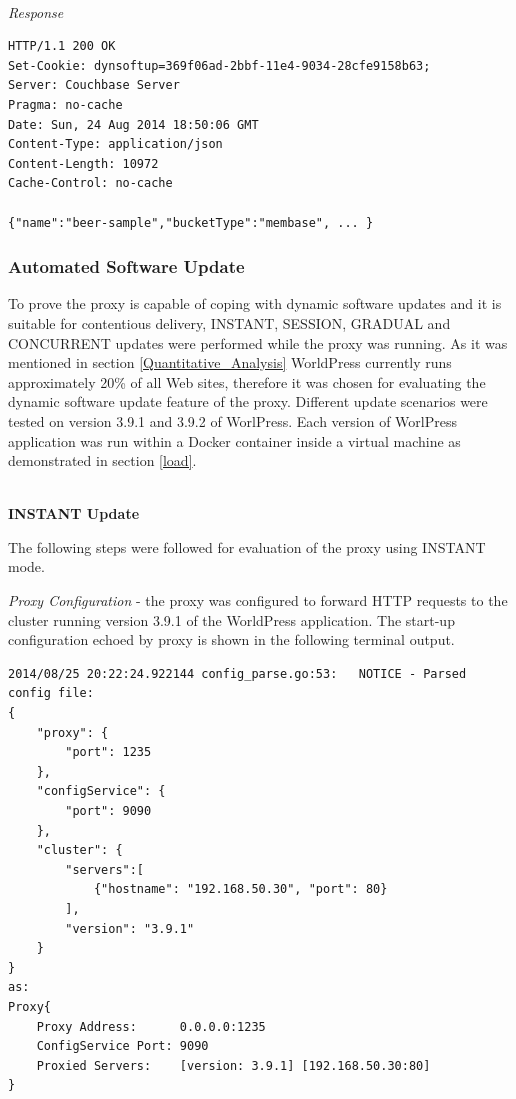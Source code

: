 \documentclass[a4paper,11pt,twoside]{article}
\begin{document}
\noindent\\
\textit{Response}
\begin{lstlisting}[language=terminal]
HTTP/1.1 200 OK
Set-Cookie: dynsoftup=369f06ad-2bbf-11e4-9034-28cfe9158b63;
Server: Couchbase Server
Pragma: no-cache
Date: Sun, 24 Aug 2014 18:50:06 GMT
Content-Type: application/json
Content-Length: 10972
Cache-Control: no-cache

{"name":"beer-sample","bucketType":"membase", ... }
\end{lstlisting}

\subsubsection{Automated Software Update} 
To prove the proxy is capable of coping with dynamic software updates and it is suitable for contentious delivery, INSTANT, SESSION, GRADUAL and CONCURRENT updates were performed while the proxy was running.  As it was mentioned in section \ref{Quantitative_Analysis} WorldPress currently runs approximately 20\% of all Web sites, therefore it was chosen for evaluating the dynamic software update feature of the proxy. Different update scenarios were tested on version 3.9.1 and 3.9.2 of WorlPress. Each version of WorlPress application was run within a Docker container inside a virtual machine as demonstrated in section \ref{load}. 

\noindent\\
\textbf{INSTANT Update}

\noindent
The following steps were followed for evaluation of the proxy using INSTANT mode.\medskip

\noindent
\textit{Proxy Configuration} - the proxy was configured to forward HTTP requests to the cluster running version 3.9.1 of the WorldPress application. The start-up configuration echoed by proxy is shown in the following terminal output.\smallskip

\begin{lstlisting}[language=terminal]
2014/08/25 20:22:24.922144 config_parse.go:53:   NOTICE - Parsed config file:
{
    "proxy": {
        "port": 1235
    },
    "configService": {
        "port": 9090
    },
    "cluster": {
        "servers":[
            {"hostname": "192.168.50.30", "port": 80}
        ],
        "version": "3.9.1"
    }
}
as:
Proxy{
	Proxy Address:      0.0.0.0:1235
	ConfigService Port: 9090
	Proxied Servers:    [version: 3.9.1] [192.168.50.30:80]
}   
\end{lstlisting}
\end{document}
